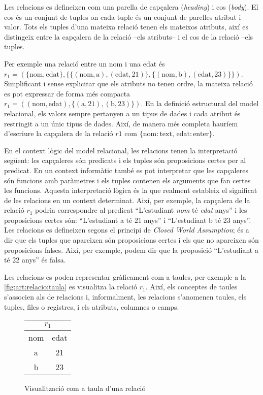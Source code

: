 Les relacions es defineixen com una parella de capçalera
(\emph{heading}) i cos (\emph{body}). El cos és un conjunt de tuples
on cada tuple és un conjunt de parelles atribut i valor. Tots els
tuples d'una mateixa relació tenen els mateixos atributs, així es
distingeix entre la capçalera de la relació --els atributs-- i el cos
de la relació --els tuples.

Per exemple una relació entre un nom i una edat és
$r_1=(\{\text{nom},\text{edat} \}, \{
\{(\text{nom},\text{a}),(\text{edat},21)\},
\{(\text{nom},\text{b}),(\text{edat},23) \} \})$.  Simplificant i
sense explicitar que els atributs no tenen ordre, la mateixa relació
es pot expressar de forma més compacta $r_1=(
(\text{nom},\text{edat}), \{ (\text{a},21),(\text{b},23) \})$.  En la
definició estructural del model relacional, els valors sempre
pertanyen a un tipus de dades i cada atribut és restringit a un únic
tipus de dades. Així, de manera més completa hauríem d'escriure la
capçalera de la relació $r1$ com $\{\text{nom}: \text{text},\,
\text{edat}:\text{enter} \}$.


En el context lògic del model relacional, les relacions tenen la
interpretació següent: les capçaleres són predicats i els tuples són
proposicions certes per al predicat. En un context informàtic també es
pot interpretar que les capçaleres són funcions amb paràmetres i els
tuples contenen els arguments que fan certes les funcions.  Aquesta
interpretació lògica és la que realment estableix el significat de les
relacions en un context determinat.  Així, per exemple, la capçalera
de la relació $r_1$ podria correspondre al predicat ``L'estudiant
\emph{nom} té \emph{edat} anys'' i les proposicions certes són:
``L'estudiant a té 21 anys'' i ``L'estudiant b té 23 anys''.  Les
relacions es defineixen segons el principi de \emph{Closed World
  Assumption}; és a dir que els tuples que apareixen són proposicions
certes i els que no apareixen són proposicions falses. Així, per
exemple, podem dir que la proposició ``L'estudiant a té 22 anys'' és
falsa.



Les relacions es poden representar gràficament com a taules, per
exemple a la \autoref{fig:art:relacio:taula} es visualitza la relació
$r_1$.  Així, els conceptes de taules s'associen als de relacions i,
informalment, les relacions s'anomenen taules, els tuples, files o
registres, i els atributs, columnes o camps.

\begin{figure}[tp]
  \centering
  \begin{tabular}[c]{|c|c|}
    \multicolumn{2}{c}{$r_1$} \\ \hline
    nom  & edat \\ \hline
    a  & 21 \\
    b  & 23 \\ \hline
  \end{tabular} 
  \caption{Visualització com a taula d'una relació}
  \label{fig:art:relacio:taula}
\end{figure}

